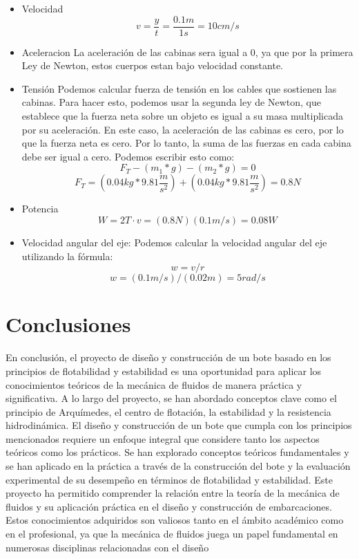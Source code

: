 \documentclass[a4paper,letterpaper]{article}
\begin{document}
\begin{itemize}
	\item Velocidad
	      \newline
	      $$v=\frac{y}{t}=\frac{0.1m}{1s}=10cm/s$$
	\item Aceleracion
	      \newline
	      La aceleración de las cabinas sera igual a 0, ya que por la primera Ley de Newton, estos cuerpos
	      estan bajo velocidad constante.
	\item Tensión
	      \newline
	      Podemos calcular fuerza de tensión en los cables que sostienen las cabinas. Para hacer esto, podemos usar la segunda ley de Newton, que establece que la fuerza neta sobre un objeto es igual a su masa multiplicada por su aceleración. En este caso, la aceleración de las cabinas es cero, por lo que la fuerza neta es cero. Por lo tanto, la suma de las fuerzas en cada cabina debe ser igual a cero. Podemos escribir esto como:
	      \newline
	      $$F_{T}-\left ( m_{1}*g \right )-\left ( m_{2}*g \right )=0$$
	      $$F_{T}=\left ( 0.04kg*9.81\frac{m}{{s}^2} \right )+\left ( 0.04kg*9.81\frac{m}{{s}^2} \right )=0.8N$$
	\item Potencia
	      $$W=2T\cdot v=\left ( 0.8N \right )\left ( 0.1m/s \right )=0.08W$$
	\item Velocidad angular del eje:
	      \newline
	      Podemos calcular la velocidad angular del eje utilizando la fórmula:
	      \newline
	      $$w = v/r$$
	      $$w =\left ( 0.1m/s \right )/\left ( 0.02m \right )=5 rad/s$$
\end{itemize}
\section*{Conclusiones}
En conclusión, el proyecto de diseño y construcción de un bote basado en los principios de flotabilidad y estabilidad es una oportunidad para aplicar los conocimientos teóricos de la mecánica de fluidos de manera práctica y significativa. A lo largo del proyecto, se han abordado conceptos clave como el principio de Arquímedes, el centro de flotación, la estabilidad y la resistencia hidrodinámica.
El diseño y construcción de un bote que cumpla con los principios mencionados requiere un enfoque integral que considere tanto los aspectos teóricos como los prácticos. Se han explorado conceptos teóricos fundamentales y se han aplicado en la práctica a través de la construcción del bote y la evaluación experimental de su desempeño en términos de flotabilidad y estabilidad.
Este proyecto ha permitido comprender la relación entre la teoría de la mecánica de fluidos y su aplicación práctica en el diseño y construcción de embarcaciones. Estos conocimientos adquiridos son valiosos tanto en el ámbito académico como en el profesional, ya que la mecánica de fluidos juega un papel fundamental en numerosas disciplinas relacionadas con el diseño


\newpage
\section*{}

\nocite{*}

\end{document}

